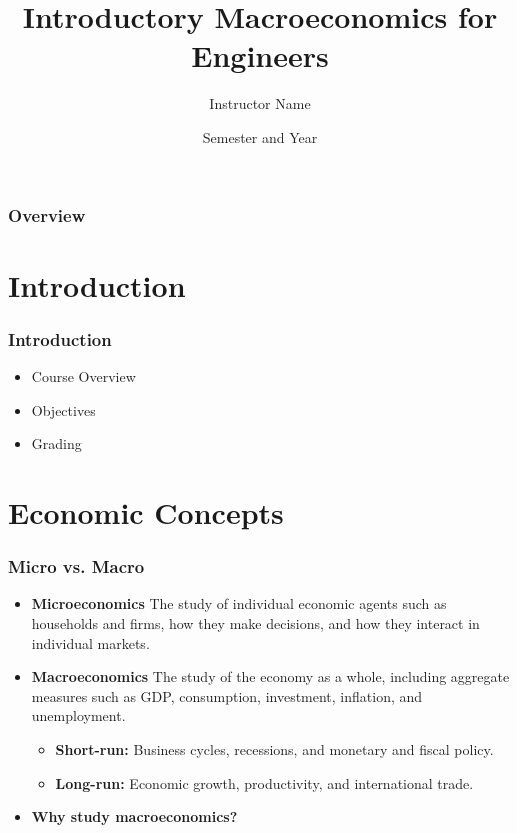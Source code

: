 \documentclass{beamer}
\title{Introductory Macroeconomics for Engineers}
\author{Instructor Name}
\date{Semester and Year}
\begin{document}
\begin{frame}
\titlepage
\end{frame}

\begin{frame}
\frametitle{Overview}
\tableofcontents
\end{frame}

\section{Introduction}
\begin{frame}
\frametitle{Introduction}
\begin{itemize}
    \item Course Overview
    \item Objectives
    \item Grading
\end{itemize}
\end{frame}

\section{Economic Concepts}
\begin{frame}
\frametitle{Micro vs. Macro}
\begin{itemize}
    \item \textbf{Microeconomics}
    The study of individual economic agents such as households and firms,
    how they make decisions, and how they interact in individual markets.
    \pause
    \item \textbf{Macroeconomics}
    The study of the economy as a whole, including aggregate measures such as
    GDP, consumption, investment, inflation, and unemployment.
    \begin{itemize}
        \item \textbf{Short-run:} Business cycles, recessions, and monetary and fiscal policy.
        \item \textbf{Long-run:} Economic growth, productivity, and international trade.
    \end{itemize}
    \item \textbf{Why study macroeconomics?}
\end{itemize}
\end{frame}
\end{document}
